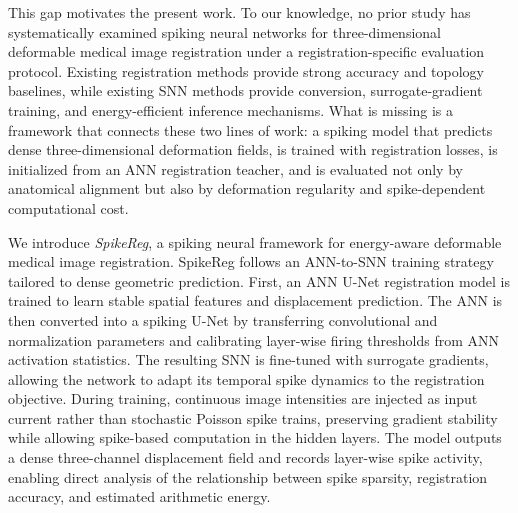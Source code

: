 
This gap motivates the present work. To our knowledge, no prior study has systematically examined spiking neural networks for three-dimensional deformable medical image registration under a registration-specific evaluation protocol. Existing registration methods provide strong accuracy and topology baselines, while existing SNN methods provide conversion, surrogate-gradient training, and energy-efficient inference mechanisms. What is missing is a framework that connects these two lines of work: a spiking model that predicts dense three-dimensional deformation fields, is trained with registration losses, is initialized from an ANN registration teacher, and is evaluated not only by anatomical alignment but also by deformation regularity and spike-dependent computational cost.


We introduce \textit{SpikeReg}, a spiking neural framework for energy-aware deformable medical image registration. SpikeReg follows an ANN-to-SNN training strategy tailored to dense geometric prediction. First, an ANN U-Net registration model is trained to learn stable spatial features and displacement prediction. The ANN is then converted into a spiking U-Net by transferring convolutional and normalization parameters and calibrating layer-wise firing thresholds from ANN activation statistics. The resulting SNN is fine-tuned with surrogate gradients, allowing the network to adapt its temporal spike dynamics to the registration objective. During training, continuous image intensities are injected as input current rather than stochastic Poisson spike trains, preserving gradient stability while allowing spike-based computation in the hidden layers. The model outputs a dense three-channel displacement field and records layer-wise spike activity, enabling direct analysis of the relationship between spike sparsity, registration accuracy, and estimated arithmetic energy.

